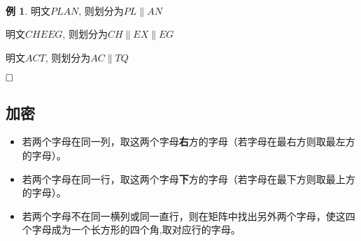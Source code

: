 \documentclass{article}
\theoremstyle{definition}
\newtheorem{example}{\indent 例}
\begin{document}
~\\

\begin{example}


明文$PLAN$, 则划分为$PL \| AN$ 

明文$CHEEG$, 则划分为$CH \| EX \| EG$ 

明文$ACT$, 则划分为$AC \| TQ$  

\end{example}

$\hfill\square$ 

\subsection{加密}
\begin{itemize}
\item 若两个字母在同一列，取这两个字母\textbf{右}方的字母（若字母在最右方则取最左方的字母）。
\item 若两个字母在同一行，取这两个字母\textbf{下}方的字母（若字母在最下方则取最上方的字母）。
\item 若两个字母不在同一横列或同一直行，则在矩阵中找出另外两个字母，使这四个字母成为一个长方形的四个角,取对应行的字母。
\end{itemize}

~\\
\end{document}
